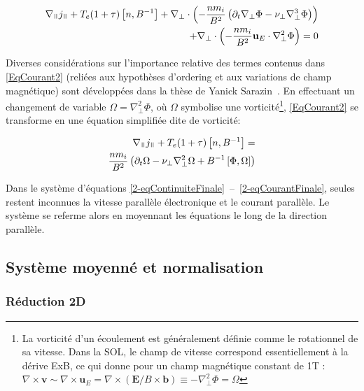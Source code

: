 \begin{refsection}
\begin{equation}\begin{split}
\label{EqCourant2}
\nabla_\para j_\para +
T_e(1+\tau)\left[n,B\puissance{-1}\right] +
\nabla_\perp\cdot\left(-\frac{nm_{i}}{B^2}\left(\partial_{t}\nabla_\perp \Phi - \nu_\perp \nabla_\perp^3 \Phi \right)\right) \\+
\nabla_\perp\cdot\left(-\frac{nm_{i}}{B^2}\mathbf{u}_E\cdot\nabla_\perp^2
\Phi\right)=0
\end{split}
\end{equation}

Diverses considérations sur l'importance relative des termes contenus dans
\eqref{EqCourant2} (reliées aux hypothèses d'ordering
et aux variations de champ magnétique) sont développées dans la thèse de Yanick
Sarazin~\cite{SarazinPhD}. En effectuant un changement de variable
$\Omega=\nabla_\perp^2\Phi$, où $\Omega$ symbolise une vorticité\footnote{La
vorticité d'un écoulement est généralement définie comme le rotationnel de sa vitesse. Dans la SOL, le champ de vitesse correspond essentiellement à la dérive ExB, ce qui donne pour un champ magnétique constant de 1T : 
$\nabla\times\mathbf{v}\sim\nabla\times\mathbf{u}_E=\nabla\times(\mathbf{E}/B\times\mathbf{b})\equiv-\nabla_\perp^2
\Phi=\Omega$ }, \eqref{EqCourant2} se transforme en une équation simplifiée dite
de vorticité:

\begin{equation}\begin{split}
\label{2-eqCourantFinale}
\nabla_\para{j}_\para +
T_e(1+\tau)\left[n,B\puissance{-1}\right] =\\
\frac{nm_i}{B^2}\left(\partial_{t}\Omega - \nu_\perp
\nabla_\perp^2\Omega+
B\puissance{-1}\left[\Phi,\Omega\right]\right)
\end{split}
\end{equation} 

 Dans le système d'équations
 \eqref{2-eqContinuiteFinale}~--~\eqref{2-eqCourantFinale}, seules restent
 inconnues la vitesse parallèle électronique  et le courant parallèle. Le
 système se referme alors en moyennant les équations le long de la
 direction parallèle. 

\subsection{Système moyenné et normalisation}
\label{2-flute}
\subsubsection{Réduction 2D}


\end{refsection}
